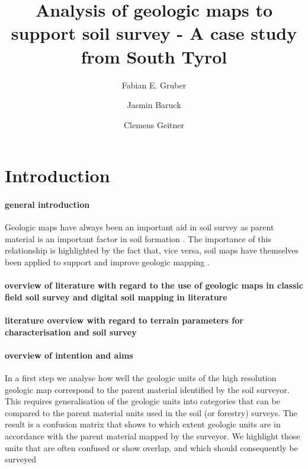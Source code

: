 \documentclass[final,1p,times,twocolumn,authoryear]{elsarticle}
\begin{document}
\begin{frontmatter}

\title{Analysis of geologic maps to support soil survey - A case study from South Tyrol}


\author{Fabian E. Gruber}
\author{Jasmin Baruck}
\author{Clemens Geitner}

\address{University of Innsbruck}

\begin{abstract}

\end{abstract}

\begin{keyword}

\end{keyword}

\end{frontmatter}

\linenumbers

\section{Introduction}
\paragraph{general introduction}
Geologic maps have always been an important aid in soil survey as parent material is an important factor in soil formation \citep{Jenny1941}. The importance of this relationship is highlighted by the fact that, vice versa, soil maps have themselves been applied to support and improve geologic mapping \citep{Brevik2015}. 

\paragraph{overview of literature with regard to the use of geologic maps in classic field soil survey and digital soil mapping in literature}
\paragraph{literature overview with regard to terrain parameters for characterisation and soil survey}
\paragraph{overview of intention and aims}
In a first step we analyse how well the geologic units of the high resolution geologic map correspond to the parent material identified by the soil surveyor. This requires generalisation of the geologic units into categories that can be compared to the parent material units used in the soil (or forestry) surveys. The result is a confusion matrix that shows to which extent geologic units are in accordance with the parent material mapped by the surveyor.  We highlight those units that are often confused or show overlap, and which should consequently be surveyed  
\end{document}
